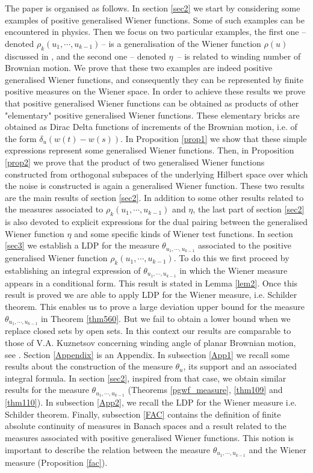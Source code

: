 \documentclass[]{interact}
\newcommand{\1}{\mathbf{1}}
\theoremstyle{plain}%
\theoremstyle{definition}
\theoremstyle{remark}
\begin{document}
The paper is organised as follows. In section \ref{sec2} we start by considering some examples of positive generalised Wiener functions. Some of such examples can be encountered in physics. Then we focus on two particular examples, the first one -- denoted $\rho_k(u_1,\cdots,u_{k-1})\,$-- is a generalisation of the Wiener function $\rho(u)$ discussed in \cite{DS23}, and the second one -- denoted $\eta\,$ -- is related to winding number of Brownian motion. We prove that these two examples are indeed positive generalised Wiener functions, and consequently they can be represented by finite positive measures on the Wiener space. In order to achieve these results we prove that positive generalised Wiener functions can be obtained as products of other "elementary" positive generalised Wiener functions. These elementary bricks are obtained as Dirac Delta functions of increments of the Brownian motion, i.e. of the form $\delta_u(w(t)-w(s))$. In Proposition \ref{prop1} we show that these simple expressions represent some generalised Wiener functions. Then, in Proposition \ref{prop2} we prove that the product of two generalised Wiener functions constructed from orthogonal subspaces of the underlying Hilbert space over which the noise is constructed is again a generalised Wiener function. These two results are the main results of section \ref{sec2}. In addition to some other results related to the measures associated to $\rho_k(u_1,\cdots,u_{k-1})$ and $\eta$, the last part of section \ref{sec2} is also devoted to explicit expressions for the dual pairing between the generalised Wiener function $\eta$ and some specific kinds of Wiener test functions. In section \ref{sec3} we establish a LDP for the measure $\theta_{u_1,\cdots,u_{k-1}}$ associated to the positive generalised Wiener function $\rho_k(u_1,\cdots,u_{k-1})$. To do this we first proceed by establishing an integral expression of $\theta_{u_1,\cdots,u_{k-1}}$ in which the Wiener measure appears in a conditional form. This result is stated in Lemma \ref{lem2}. Once this result is proved we are able to apply LDP for the Wiener measure, i.e. Schilder theorem. This enables us to prove a large deviation upper bound for the measure $\theta_{u_1,\cdots,u_{k-1}}$ in Theorem \ref{thm560}. But we fail to obtain a lower bound when we replace closed sets by open sets. In this context our results are comparable to those of V.A. Kuznetsov concerning winding angle of planar Brownian motion, see \cite{Kuz15}. Section \ref{Appendix} is an Appendix. In subsection \ref{App1} we recall some results about the construction of the measure $\theta_u$, its support and an associated integral formula. In section \ref{sec2}, inspired from that case, we obtain similar results for the measure $\theta_{u_1,\cdots,u_{k-1}}$ (Theorems \ref{pgwf_measure}, \ref{thm109} and \ref{thm110}). In subsection \ref{App2}, we recall the LDP for the Wiener measure i.e. Schilder theorem. Finally, subsection \ref{FAC} contains the definition of finite absolute continuity of measures in Banach spaces and a result related to the measures associated with positive generalised Wiener functions. This notion is important to describe the relation between the measure $\theta_{u_1,\cdots,u_{k-1}}$ and the Wiener measure (Proposition \ref{fac}).  
\end{document}
